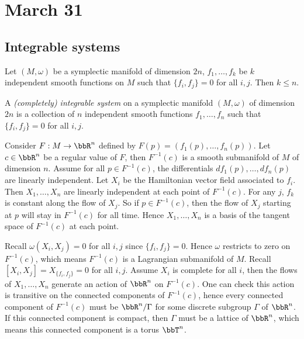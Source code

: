 \section{March 31}

\subsection{Integrable systems}

  Let $(M, \omega)$ be a symplectic manifold of dimension $2n$, $f_1, \dots, f_k$ be $k$ independent smooth functions on $M$ such that $\{f_i, f_j\} = 0$ for all $i, j$. 
  Then $k \leq n$.

  \begin{definition}
    A \emph{(completely) integrable system} on a symplectic manifold $(M, \omega)$ of dimension $2n$ is a collection of $n$ independent smooth functions $f_1, \dots, f_n$ such that $\{f_i, f_j\} = 0$ for all $i, j$.
  \end{definition}

  Consider $F: M \to \bbR^n$ defined by $F(p) = (f_1(p), \dots, f_n(p))$. 
  Let $c \in \bbR^n$ be a regular value of $F$, then $F^{-1}(c)$ is a smooth submanifold of $M$ of dimension $n$.
  Assume for all $p \in F^{-1}(c)$, the differentials $df_1(p), \dots, df_n(p)$ are linearly independent.
  Let $X_i$ be the Hamiltonian vector field associated to $f_i$.
  Then $X_1, \dots, X_n$ are linearly independent at each point of $F^{-1}(c)$.
  For any $j$, $f_k$ is constant along the flow of $X_j$.
  So if $p \in F^{-1}(c)$, then the flow of $X_j$ starting at $p$ will stay in $F^{-1}(c)$ for all time.
  Hence $X_1, \dots, X_n$ is a basis of the tangent space of $F^{-1}(c)$ at each point.

  Recall $\omega(X_i, X_j) = 0$ for all $i, j$ since $\{f_i, f_j\} = 0$.
  Hence $\omega$ restricts to zero on $F^{-1}(c)$, which means $F^{-1}(c)$ is a Lagrangian submanifold of $M$.
  Recall $[X_i, X_j] = X_{\{f_i, f_j\}} = 0$ for all $i, j$.
  Assume $X_i$ is complete for all $i$, then the flows of $X_1, \dots, X_n$ generate an action of $\bbR^n$ on $F^{-1}(c)$.
  One can check this action is transitive on the connected components of $F^{-1}(c)$,
  hence every connected component of $F^{-1}(c)$ must be $\bbR^n/\Gamma$ for some discrete subgroup $\Gamma$ of $\bbR^n$.
  If this connected component is compact, then $\Gamma$ must be a lattice of $\bbR^n$, which means this connected component is a torus $\bbT^n$.

